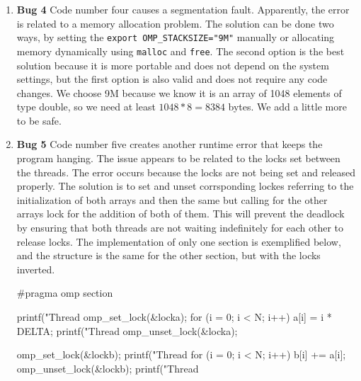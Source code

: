 \documentclass[unicode,11pt,a4paper,oneside,numbers=endperiod,openany]{scrartcl}
\begin{document}
\begin{enumerate}
  \item \textbf{Bug 4}
  Code number four causes a segmentation fault. Apparently, the error is related
 to a
  memory allocation problem. The solution can be done two ways, by setting the
  \texttt{export OMP\_STACKSIZE="9M"} manually or allocating memory dynamically
  using \texttt{malloc} and \texttt{free}. The second option is the best
  solution because it is more portable and does not depend on the system
  settings, but the first option is also valid and does not require any code
  changes. We choose 9M because we know it is an array of 1048 elements of type
  double, so we need at least $1048*8=8384$ bytes. We add a little more to be
  safe.

  \item \textbf{Bug 5}
  Code number five creates another runtime error that keeps the program hanging.
  The issue appears to be related to the locks set between the threads. The
  error occurs because the locks are not being set and released properly. The
  solution is to set and unset corrsponding lockes referring to the
  initialization of both arrays and then the same but calling for the other
  arrays lock for the addition of both of them. This will prevent the deadlock
  by ensuring that both threads are not waiting indefinitely for each other to
  release locks.
  The implementation of only one section is exemplified below, and the structure
  is the same for the other section, but with the locks inverted.
  \begin{cppverbatim}
#pragma omp section
  {
    printf("Thread %
    omp_set_lock(&locka);
    for (i = 0; i < N; i++)
      a[i] = i * DELTA;
    printf("Thread %
    omp_unset_lock(&locka);

    omp_set_lock(&lockb);
    printf("Thread %
    for (i = 0; i < N; i++)
      b[i] += a[i];
    omp_unset_lock(&lockb);
    printf("Thread %
  }
  \end{cppverbatim}

\end{enumerate}
\end{document}
